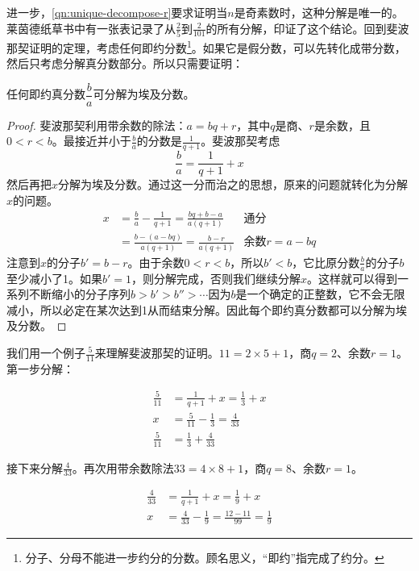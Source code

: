 \documentclass[b5paper]{ctexart}
\begin{document}
进一步，\cref{qn:unique-decompose-r}要求证明当$n$是奇素数时，这种分解是唯一的。莱茵德纸草书中有一张表记录了从$\frac{2}{5}$到$\frac{2}{101}$的所有分解，印证了这个结论。回到斐波那契证明的定理，考虑任何即约分数\footnote{分子、分母不能进一步约分的分数。顾名思义，“即约”指完成了约分。}。如果它是假分数，可以先转化成带分数，然后只考虑分解真分数部分。所以只需要证明：

\begin{theorem}[斐波那契]
任何即约真分数$\dfrac{b}{a}$可分解为埃及分数。
\end{theorem}

\begin{proof}
斐波那契利用带余数的除法：$a = bq + r$，其中$q$是商、$r$是余数，且$0 < r < b$。最接近并小于$\frac{b}{a}$的分数是$\frac{1}{q + 1}$。斐波那契考虑
\[
  \frac{b}{a} = \frac{1}{q + 1} + x
\]
然后再把$x$分解为埃及分数。通过这一分而治之的思想，原来的问题就转化为分解$x$的问题。
\begin{align*}
  x & = \frac{b}{a} - \frac{1}{q + 1} = \frac{bq + b - a}{a(q + 1)} & \text{通分} \\
    & = \frac{b - (a - bq)}{a(q+1)} = \frac{b - r}{a(q+1)} & \text{余数}r = a - bq
\end{align*}
注意到$x$的分子$b' = b - r$。由于余数$0 < r < b$，所以$b' < b$，它比原分数$\frac{b}{a}$的分子$b$至少减小了1。如果$b' = 1$，则分解完成，否则我们继续分解$x$。这样就可以得到一系列不断缩小的分子序列$b > b' > b'' > \cdots$因为$b$是一个确定的正整数，它不会无限减小，所以必定在某次达到1从而结束分解。因此每个即约真分数都可以分解为埃及分数。
\end{proof}

我们用一个例子$\frac{5}{11}$来理解斐波那契的证明。$11 = 2 \times 5 + 1$，商$q = 2$、余数$r = 1$。第一步分解：

\begin{align*}
\frac{5}{11} & = \frac{1}{q + 1} + x = \frac{1}{3} + x  \\
 x &= \frac{5}{11} - \frac{1}{3} = \frac{4}{33} \\
\frac{5}{11} &= \frac{1}{3} + \frac{4}{33}
\end{align*}

接下来分解$\frac{4}{33}$。再次用带余数除法$33 = 4 \times 8 + 1$，商$q = 8$、余数$r = 1$。

\begin{align*}
\frac{4}{33} & = \frac{1}{q + 1} + x = \frac{1}{9} + x  \\
 x &= \frac{4}{33} - \frac{1}{9} = \frac{12 - 11}{99} = \frac{1}{9}
\end{align*}
\end{document}
